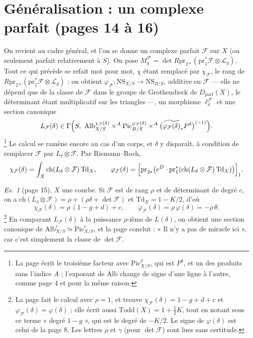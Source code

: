 \documentclass[11pt,a4paper]{article}
\begin{document}
\section*{Généralisation : un complexe parfait (pages 14 à 16)}

On revient au cadre général, et l'on se donne un complexe parfait
$\mathcal{F}$ sur $X$ (ou seulement parfait relativement à $S$). On pose
$M_g^{\mathcal{F}} = \det R\mathrm{pr}_{2*}(\mathrm{pr}_1^{*}\mathcal{F} \otimes
\mathcal{L}_g)$. Tout ce qui précède se refait mot pour mot, $\chi$ étant
remplacé par $\chi_{\mathcal{F}}$, le rang de $R\mathrm{pr}_{2*}
(\mathrm{pr}_1^{*}\mathcal{F} \otimes \mathcal{L}_g)$ : on obtient
$\varphi_{\mathcal{F}} : \mathrm{NS}_{X/S} \to \mathrm{NS}_{B/S}$, additive en
$\mathcal{F}$ — elle ne dépend que de la classe de $\mathcal{F}$ dans le groupe
de Grothendieck de $D_{\mathrm{parf}}(X)$, le déterminant étant multiplicatif
sur les triangles —, un morphisme $\ell^{\mathcal{F}}_{\delta}$ et une section
canonique
\[
L_{\mathcal{F}}(\delta) \in \Gamma\Bigl(S,\ \mathrm{Alb}^{\chi_{\mathcal{F}}(\delta)}_{X/S}
\times^{A} \mathrm{Pic}^{\varphi_{\mathcal{F}}(\delta)}_{B/S} \times^{A}
\bigl(\widetilde{\varphi_{\mathcal{F}}(\delta)}_{*}P^{\delta}\bigr)^{(-1)}\Bigr).
\]
\footnote{La page écrit le troisième facteur avec
$\mathrm{Pic}^{\delta}_{X/S}$, qui est $P^{\delta}$, et un des produits sans
l'indice $A$ ; l'exposant de $\mathrm{Alb}$ change de signe d'une ligne à
l'autre, comme page 4 et pour la même raison.} Le calcul se ramène encore au
cas d'un corps, et $\delta$ y disparaît, à condition de remplacer
$\mathcal{F}$ par $L_{\delta} \otimes \mathcal{F}$. Par Riemann--Roch,
\[
\chi_{\mathcal{F}}(\delta) = \int_X \mathrm{ch}(L_{\delta} \otimes \mathcal{F})\,\mathrm{Td}_X,
\qquad
\varphi_{\mathcal{F}}(\delta) = \Bigl[\mathrm{pr}_{2*}\bigl(e^{D}\cdot
\mathrm{pr}_1^{*}(\mathrm{ch}(L_{\delta} \otimes \mathcal{F})\,\mathrm{Td}_X)\bigr)\Bigr]_{1}.
\]

\emph{Ex. 1} (page 15), $X$ une courbe. Si $\mathcal{F}$ est de rang $\rho$ et
de déterminant de degré $c$, on a $\mathrm{ch}(L_{\delta} \otimes \mathcal{F})
= \rho + (\rho\delta + \det\mathcal{F})$ et $\mathrm{Td}_X = 1 - K/2$, d'où
\[
\chi_{\mathcal{F}}(\delta) = \rho\,(1 - g + d) + c,
\qquad
\varphi_{\mathcal{F}}(\delta) = \rho\,\varphi(\delta) = -\rho\,\theta .
\]
\footnote{La page fait le calcul avec $\rho = 1$, et trouve
$\chi_{\mathcal{F}}(\delta) = 1 - g + d + c$ et $\varphi_{\mathcal{F}}(\delta)
= \varphi(\delta)$ ; elle écrit aussi $\mathrm{Todd}(X) = 1 + \tfrac{1}{2}K$,
tout en notant sous ce terme « degré $1 - g$ », qui est le degré de $-K/2$. Le
signe de $\varphi(\delta)$ est celui de la page 8. Les lettres $\rho$ et
$\gamma$ (pour $\det \mathcal{F}$) sont lues sans certitude.} En comparant
$L_{\mathcal{F}}(\delta)$ à la puissance $\rho$-ième de $L(\delta)$, on obtient
une section canonique de $\mathrm{Alb}^{c}_{X/S} \simeq \mathrm{Pic}^{c}_{X/S}$,
et la page conclut : « Il n'y a pas de miracle ici », car c'est simplement la
classe de $\det\mathcal{F}$.
\end{document}
